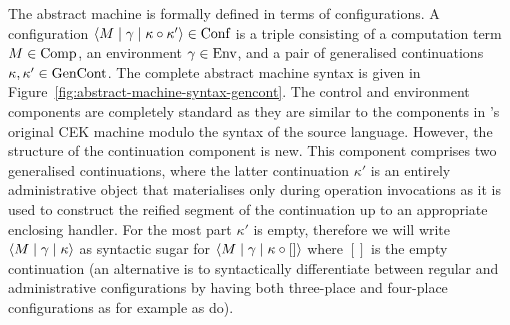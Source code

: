 \documentclass[12pt,phd,lfcs,twoside,openright,logo,leftchapter,normalheadings]{infthesis}
\theoremstyle{plain}
\theoremstyle{definition}
\begin{document}
The abstract machine is formally defined in terms of configurations. A
configuration $\langle M \mid \gamma \mid \kappa \circ \kappa' \rangle \in \textrm{Conf}$
is a triple consisting of a computation term $M \in \textrm{Comp}$, an
environment $\gamma \in \textrm{Env}$, and a pair of generalised
continuations $\kappa,\kappa' \in \textrm{GenCont}$.
%
The complete abstract machine syntax is given in
Figure~\ref{fig:abstract-machine-syntax-gencont}.
%
The control and environment components are completely standard as they
are similar to the components in \citeauthor{FelleisenF86}'s original
CEK machine modulo the syntax of the source language.
%
However, the structure of the continuation component is new. This
component comprises two generalised continuations, where the latter
continuation $\kappa'$ is an entirely administrative object that
materialises only during operation invocations as it is used to
construct the reified segment of the continuation up to an appropriate
enclosing handler. For the most part $\kappa'$ is empty, therefore we
will write $\langle M \mid \gamma \mid \kappa \rangle$ as syntactic sugar for
$\langle M \mid \gamma \mid \kappa \circ [] \rangle$ where $[]$ is the empty
continuation (an alternative is to syntactically differentiate between
regular and administrative configurations by having both three-place
and four-place configurations as for example as \citet{BiernackaBD03}
do).
%
\end{document}
